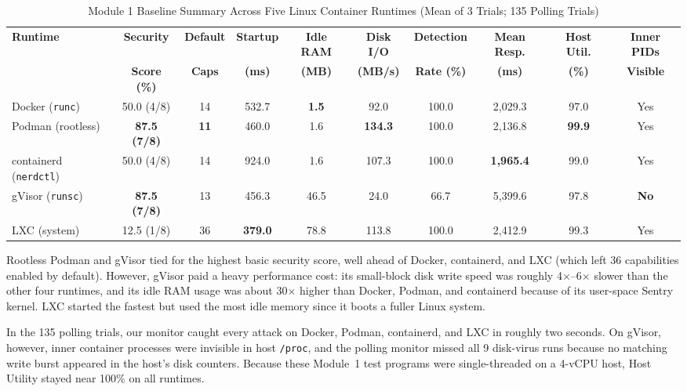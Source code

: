 \documentclass[conference]{IEEEtran}
\begin{document}
\begin{table}[t]
\centering
\caption{Module 1 Baseline Summary Across Five Linux Container Runtimes (Mean of 3 Trials; 135 Polling Trials)}
\label{tab:m1_summary}
\begin{tabular}{lccccccccc}
\toprule
\textbf{Runtime} & \textbf{Security} & \textbf{Default} & \textbf{Startup} & \textbf{Idle RAM} & \textbf{Disk I/O} & \textbf{Detection} & \textbf{Mean Resp.} & \textbf{Host Util.} & \textbf{Inner PIDs} \\
 & \textbf{Score (\%)} & \textbf{Caps} & \textbf{(ms)} & \textbf{(MB)} & \textbf{(MB/s)} & \textbf{Rate (\%)} & \textbf{(ms)} & \textbf{(\%)} & \textbf{Visible} \\
\midrule
Docker (\texttt{runc})        & 50.0 (4/8) & 14 & 532.7 & \textbf{1.5} & 92.0  & 100.0 & 2,029.3 & 97.0 & Yes \\
Podman (rootless)             & \textbf{87.5 (7/8)} & \textbf{11} & 460.0 & 1.6 & \textbf{134.3} & 100.0 & 2,136.8 & \textbf{99.9} & Yes \\
containerd (\texttt{nerdctl}) & 50.0 (4/8) & 14 & 924.0 & 1.6 & 107.3 & 100.0 & \textbf{1,965.4} & 99.0 & Yes \\
gVisor (\texttt{runsc})       & \textbf{87.5 (7/8)} & 13 & 456.3 & 46.5 & 24.0  & 66.7  & 5,399.6 & 97.8 & \textbf{No} \\
LXC (system)                  & 12.5 (1/8) & 36 & \textbf{379.0} & 78.8 & 113.8 & 100.0 & 2,412.9 & 99.3 & Yes \\
\bottomrule
\end{tabular}
\end{table}

Rootless Podman and gVisor tied for the highest basic security score, well ahead of Docker, containerd, and LXC (which left 36 capabilities enabled by default). However, gVisor paid a heavy performance cost: its small-block disk write speed was roughly 4$\times$--6$\times$ slower than the other four runtimes, and its idle RAM usage was about 30$\times$ higher than Docker, Podman, and containerd because of its user-space Sentry kernel. LXC started the fastest but used the most idle memory since it boots a fuller Linux system.

In the 135 polling trials, our monitor caught every attack on Docker, Podman, containerd, and LXC in roughly two seconds. On gVisor, however, inner container processes were invisible in host \texttt{/proc}, and the polling monitor missed all 9 disk-virus runs because no matching write burst appeared in the host's disk counters. Because these Module~1 test programs were single-threaded on a 4-vCPU host, Host Utility stayed near 100\% on all runtimes.
\end{document}

